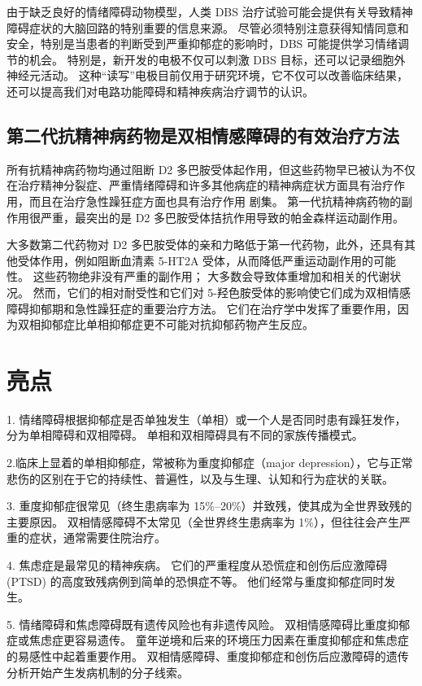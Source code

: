 由于缺乏良好的情绪障碍动物模型，人类 DBS 治疗试验可能会提供有关导致精神障碍症状的大脑回路的特别重要的信息来源。 尽管必须特别注意获得知情同意和安全，特别是当患者的判断受到严重抑郁症的影响时，DBS 可能提供学习情绪调节的机会。 特别是，新开发的电极不仅可以刺激 DBS 目标，还可以记录细胞外神经元活动。 这种“读写”电极目前仅用于研究环境，它不仅可以改善临床结果，还可以提高我们对电路功能障碍和精神疾病治疗调节的认识。

\subsection{第二代抗精神病药物是双相情感障碍的有效治疗方法}

所有抗精神病药物均通过阻断 D2 多巴胺受体起作用，但这些药物早已被认为不仅在治疗精神分裂症、严重情绪障碍和许多其他病症的精神病症状方面具有治疗作用，而且在治疗急性躁狂症方面也具有治疗作用 剧集。 第一代抗精神病药物的副作用很严重，最突出的是 D2 多巴胺受体拮抗作用导致的帕金森样运动副作用。

大多数第二代药物对 D2 多巴胺受体的亲和力略低于第一代药物，此外，还具有其他受体作用，例如阻断血清素 5-HT2A 受体，从而降低严重运动副作用的可能性。 这些药物绝非没有严重的副作用； 大多数会导致体重增加和相关的代谢状况。 然而，它们的相对耐受性和它们对 5-羟色胺受体的影响使它们成为双相情感障碍抑郁期和急性躁狂症的重要治疗方法。 它们在治疗学中发挥了重要作用，因为双相抑郁症比单相抑郁症更不可能对抗抑郁药物产生反应。

\section{亮点}

1. 情绪障碍根据抑郁症是否单独发生（单相）或一个人是否同时患有躁狂发作，分为单相障碍和双相障碍。 单相和双相障碍具有不同的家族传播模式。 

2.临床上显着的单相抑郁症，常被称为重度抑郁症（major depression），它与正常悲伤的区别在于它的持续性、普遍性，以及与生理、认知和行为症状的关联。 

3. 重度抑郁症很常见（终生患病率为 15\%–20\%）并致残，使其成为全世界致残的主要原因。 双相情感障碍不太常见（全世界终生患病率为 1\%），但往往会产生严重的症状，通常需要住院治疗。 

4. 焦虑症是最常见的精神疾病。 它们的严重程度从恐慌症和创伤后应激障碍 (PTSD) 的高度致残病例到简单的恐惧症不等。 他们经常与重度抑郁症同时发生。 

5. 情绪障碍和焦虑障碍既有遗传风险也有非遗传风险。 双相情感障碍比重度抑郁症或焦虑症更容易遗传。 童年逆境和后来的环境压力因素在重度抑郁症和焦虑症的易感性中起着重要作用。 双相情感障碍、重度抑郁症和创伤后应激障碍的遗传分析开始产生发病机制的分子线索。 

